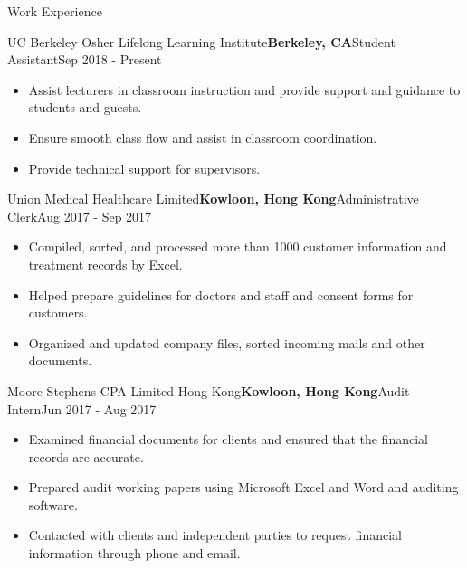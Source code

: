 \documentclass{resume} %
\begin{document}
\begin{rSection}{Work Experience}

\begin{rSubsection}{UC Berkeley Osher Lifelong Learning Institute}{\bf {Berkeley, CA}}{Student Assistant}{Sep 2018 - Present}
\begin{itemize}
    \item Assist lecturers in classroom instruction and provide support and guidance to students and guests.
    \item Ensure smooth class flow and assist in classroom coordination.
    \item Provide technical support for supervisors.
\end{itemize}
\end{rSubsection}

\begin{rSubsection}{Union Medical Healthcare Limited}{\bf {Kowloon, Hong Kong}}{Administrative Clerk}{Aug 2017 - Sep 2017}
\begin{itemize}
    \item Compiled, sorted, and processed more than 1000 customer information and treatment records by Excel.
    \item Helped prepare guidelines for doctors and staff and consent forms for customers.
    \item Organized and updated company files, sorted incoming mails and other documents.
\end{itemize}
\end{rSubsection}

\begin{rSubsection}{Moore Stephens CPA Limited Hong Kong}{\bf {Kowloon, Hong Kong}}{Audit Intern}{Jun 2017 - Aug 2017}
\begin{itemize}
    \item Examined financial documents for clients and ensured that the financial records are accurate.
    \item Prepared audit working papers using Microsoft Excel and Word and auditing software.
    \item Contacted with clients and independent parties to request financial information through phone and email.
\end{itemize}
\end{rSubsection}

\end{rSection}

\newpage

\end{document}
